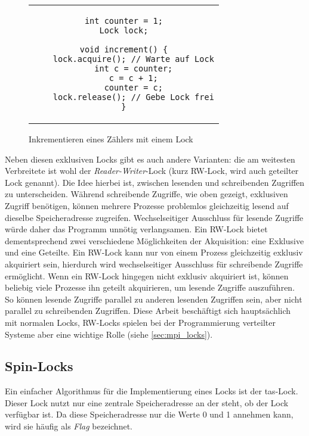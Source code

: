 \begin{figure}[h]
    \centering
    \begin{tabular}{c}\begin{lstlisting}
int counter = 1;
Lock lock;

void increment() {
    lock.acquire(); // Warte auf Lock
    int c = counter;
    c = c + 1;
    counter = c;
    lock.release(); // Gebe Lock frei
}
    \end{lstlisting}\end{tabular}
    \caption{Inkrementieren eines Zählers mit einem Lock}
    \label{fig:lockedcounter}
\end{figure}

Neben diesen exklusiven Locks gibt es auch andere Varianten:
die am weitesten Verbreitete ist wohl der \textit{Reader-Writer}-Lock (kurz RW-Lock, wird auch geteilter Lock genannt).
Die Idee hierbei ist,
zwischen lesenden und schreibenden Zugriffen zu unterscheiden.
Während schreibende Zugriffe,
wie oben gezeigt,
exklusiven Zugriff benötigen,
können mehrere Prozesse problemlos gleichzeitig lesend auf dieselbe Speicheradresse zugreifen.
Wechselseitiger Ausschluss für lesende Zugriffe würde daher das Programm unnötig verlangsamen.
Ein RW-Lock bietet dementsprechend zwei verschiedene Möglichkeiten der Akquisition:
eine Exklusive und eine Geteilte.
Ein RW-Lock kann nur von einem Prozess gleichzeitig exklusiv akquiriert sein,
hierdurch wird wechselseitiger Ausschluss für schreibende Zugriffe ermöglicht.
Wenn ein RW-Lock hingegen nicht exklusiv akquiriert ist,
können beliebig viele Prozesse ihn geteilt akquirieren,
um lesende Zugriffe auszuführen.
So können lesende Zugriffe parallel zu anderen lesenden Zugriffen sein,
aber nicht parallel zu schreibenden Zugriffen.
Diese Arbeit beschäftigt sich hauptsächlich mit normalen Locks,
RW-Locks spielen bei der Programmierung verteilter Systeme aber eine wichtige Rolle
(siehe \autoref{sec:mpi_locks}).

\subsection{Spin-Locks}
\label{sec:spin_locks}

Ein einfacher Algorithmus für die Implementierung eines Locks ist der \gls{tas}-Lock.
Dieser Lock nutzt nur eine zentrale Speicheradresse an der steht,
ob der Lock verfügbar ist.
Da diese Speicheradresse nur die Werte 0 und 1 annehmen kann,
wird sie häufig als \textit{Flag} bezeichnet.

